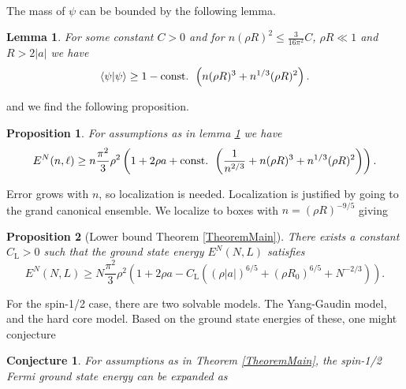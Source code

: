 \documentclass[final]{beamer}
\newcommand{\abs}[1]{\left\lvert #1 \right\rvert}
\renewcommand{\braket}[1]{\left\langle#1\right\rangle}
\newtheorem{mproposition}{Proposition}
\newtheorem{mlemma}{Lemma}
\newtheorem{mconjecture}{Conjecture}
\newlength{\colwidth}
\begin{document}
\begin{frame}[t]
\begin{columns}[t]
\begin{column}{\colwidth}
\begin{tcolorbox}[colframe=qmathblue,colback=qmathbluelyslyslys,title=Lower bound proof sketch]
\begin{equation}
\begin{aligned}
				\end{aligned}
				\end{equation}
		The mass of $ \psi $ can be bounded by the following lemma.
		\begin{mlemma}\label{LemmaImprovedMassBound}
			For some constant $C>0$ and for $ n(\rho R)^2\leq  \frac{3}{16\pi^2}C $, $ \rho R\ll 1 $ and $ R>2\abs{a} $ we have
			\begin{equation}\label{EqImprovedMassBound}
			\begin{aligned}
			\braket{\psi|\psi} \geq 1-\textnormal{const. }\left(n(\rho R)^3+n^{1/3}(\rho R)^2\right).
			\end{aligned}
			\end{equation}
		\end{mlemma}
		and we find the following proposition. \begin{mproposition}\label{PropositionLowerBoundSpecN}
			For assumptions as in lemma \ref{LemmaImprovedMassBound} we have \begin{equation}
			E^N(n,\ell)\geq n\frac{\pi^2}{3}\rho^2\left(1+2\rho a+\textnormal{const. }\left(\frac{1}{n^{2/3}}+n(\rho R)^3+n^{1/3}(\rho R)^2\right)\right).
			\end{equation}
		\end{mproposition}
		Error grows with $n$, so localization is needed. Localization is justified by going to the grand canonical ensemble. We localize to boxes with $n=(\rho R)^{-9/5}$ giving
		\begin{mproposition}[Lower bound Theorem \ref{TheoremMain}]
			\label{PropositionLowerBound}
			There exists a constant $C_\text{L}>0$ such that the ground state energy $E^N(N,L)$ satisfies
			\begin{equation}
			\label{eqlower}
			E^N(N,L)\geq N\frac{\pi^2}{3}\rho^2\left(1+2\rho a-C_\text{L}\left((\rho\abs{a})^{6/5}+(\rho R_0)^{6/5}+N^{-2/3}\right)\right).
			\end{equation}
		\end{mproposition}
	\end{tcolorbox}\vspace{0.75cm}
	\begin{tcolorbox}[colframe=qmathblue,colback=qmathbluelyslyslys,title=Spin-1/2 conjecture]
		For the spin-1/2 case, there are two solvable models. The Yang-Gaudin model, and the hard core model. Based on the ground state energies of these, one might conjecture
		\begin{mconjecture}
		For assumptions as in Theorem \ref{TheoremMain}, the spin-1/2 Fermi ground state energy can be expanded as

\end{mconjecture}
\end{tcolorbox}
\end{column}
\end{columns}
\end{frame}
\end{document}

